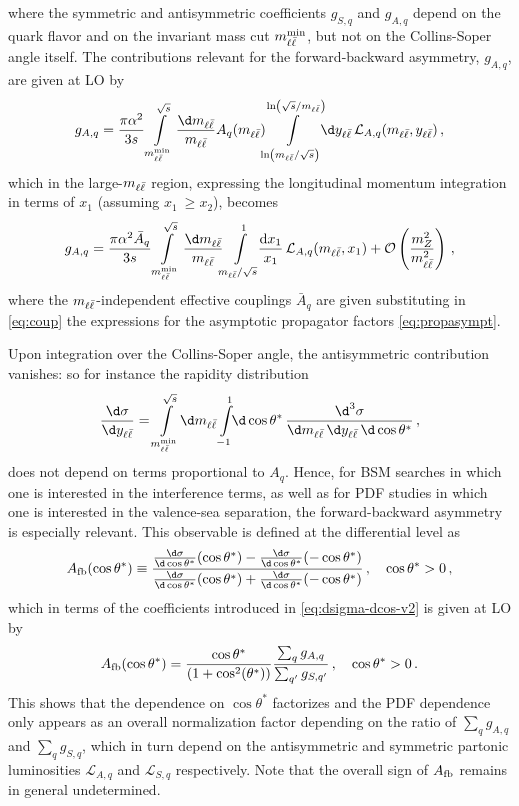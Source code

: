 where the symmetric and antisymmetric coefficients $g_{S,q}$ and $g_{A,q}$ depend on the quark flavor
and on the invariant mass cut $m_{\ell\bar{\ell}}^{{\rm min}}$, but not on the
Collins-Soper angle itself.
%
The contributions relevant for the forward-backward asymmetry, $g_{A,q}$,
are given at LO by
\begin{equation}
\label{eq:gAq_integrated_1}
g_{A,q} =\frac{\pi \alpha^2}{3 s} \int\limits_{\mll^{{\rm min}}}^{\sqrt s}\frac{\d\mll}{\mll}A_{q}(\mll)\!\!\int\limits_{\ln(\mll/\sqrt s)}^{\ln(\sqrt s/\mll)}\!\!\d\yll\, \mathcal{L}_{A,q}(\mll,\yll) \, ,
\end{equation}
which in the large-$m_{\ell\bar{\ell}}$ region,
 expressing the longitudinal momentum integration in terms of
$x_1$ (assuming $x_1~\ge x_2$), becomes
\begin{equation}
\label{eq:gAq_integrated}
g_{A,q} = \frac{\pi \alpha^2\bar A_q}{3 s} \int\limits_{\mll^{{\rm min}}}^{\sqrt s}\frac{\d\mll}{\mll} \!\!\int\limits_{\mll/\sqrt s}^{1}\!\!\frac{{\rm d}x_1}{x_1}\, \mathcal{L}_{A,q}(\mll,x_1)+\mathcal{O} \left(\frac{m_Z^2}{\mll^2}\right) \, ,
\end{equation}
where the  $m_{\ell\bar{\ell}}$-independent effective couplings $\bar A_q$  are
given substituting in \cref{eq:coup} the expressions for
the asymptotic propagator factors \cref{eq:propasympt}.

Upon integration over the Collins-Soper angle, the
antisymmetric contribution vanishes: so for instance the
rapidity distribution
\begin{equation}
  \label{eq:dsigma-dyll}
  \frac{\d\sigma}{\d\yll} = \int\limits_{\mll^{{\rm min}}}^{\sqrt s}\!\d\mll \int\limits_{-1}^{1}\!\!\d\cos\theta^*\, \frac{\d^3 \sigma}{\d \mll \, \d \yll \, \d\cos\theta^*} \, ,
\end{equation}
does not depend on terms proportional to $A_q$.
%
Hence, for BSM searches in which one is
interested in the interference terms, as well as for PDF studies in which one is
interested in the valence-sea separation, the forward-backward
asymmetry is especially relevant.
%
This observable is
defined at the differential level as
\begin{equation}
  A_{\rm fb}(\cos\theta^*) \equiv \frac{ \frac{\d\sigma}{\d\cos\theta^*}(\cos\theta^*)
  - \frac{\d\sigma}{\d\cos\theta^*}(-\cos\theta^*)}{ \frac{\d\sigma}{\d\cos\theta^*}(\cos\theta^*)
  + \frac{\d\sigma}{\d\cos\theta^*}(-\cos\theta^*) } \, ,\quad \cos\theta^*>0 \, ,
  \label{eq:forward-backward-asymmetry}
\end{equation}
which in terms of the coefficients introduced in
\cref{eq:dsigma-dcos-v2} is given at LO by
\begin{equation}
  \label{eq:afb_lo}
  A_{\rm fb}(\cos\theta^*)   = \frac{\cos\theta^*}{(1+\cos^2(\theta^*))}\frac{\sum_q g_{A,q} }{\sum_{q'} g_{S,q'}} \, ,\quad \cos\theta^*>0 \,.
\end{equation}
This  shows that the dependence on $\cos\theta^*$ factorizes
and the PDF dependence only appears as an overall normalization factor
depending on the ratio of $\sum_q g_{A,q}$
and $\sum_q g_{S,q}$, which in turn depend on the antisymmetric and symmetric
partonic luminosities $ \mathcal{L}_{A,q}$ and $ \mathcal{L}_{S,q}$ respectively.
%
Note that the overall sign of $A_{\rm fb}$ remains in general undetermined.

